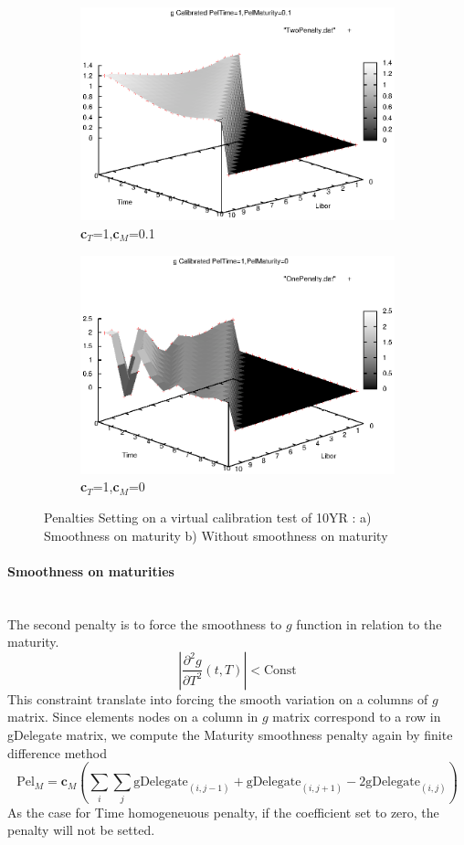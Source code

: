 \documentclass[a4paper,10pt]{article}
\begin{document}
\begin{figure}[h]
\begin{subfigure}{.5\textwidth}
  \centering
  \includegraphics[scale=0.6]{PenaltyTwo}
  \caption{\textbf{c}$_T$=1,\textbf{c}$_M$=0.1}
  \label{fig:penalty_two}
\end{subfigure}%
\begin{subfigure}{.5\textwidth}
  \centering
  \includegraphics[scale=0.6]{PenaltyOne}
  \caption{\textbf{c}$_T$=1,\textbf{c}$_M$=0}
  \label{fig:penalty_one}
\end{subfigure}
\caption{Penalties Setting on a virtual calibration test of 10YR : a) Smoothness on maturity b) Without smoothness on maturity }
\label{fig:penalty}
\end{figure}
\paragraph{Smoothness on maturities}\mbox{}\\
The second penalty is to force the smoothness to $g$ function in relation to the maturity. 
\[
 |\frac{\partial^2 g}{\partial T^2}(t,T) | < \text{Const}
\]
This constraint translate into forcing the smooth variation on a columns of $g$ matrix. Since elements nodes on a column in $g$ matrix correspond to a row in gDelegate matrix, we compute the Maturity smoothness penalty again by finite difference method
\[
\text{Pel}_{M} = \textbf{c}_{M} (\sum_i \sum_j \text{gDelegate}_{(i,j-1)} + \text{gDelegate}_{(i,j+1)} - 2 \text{gDelegate}_{(i,j)} )
\]
As the case for Time homogeneuous penalty, if the coefficient set to zero, the penalty will not be setted.
\end{document}
